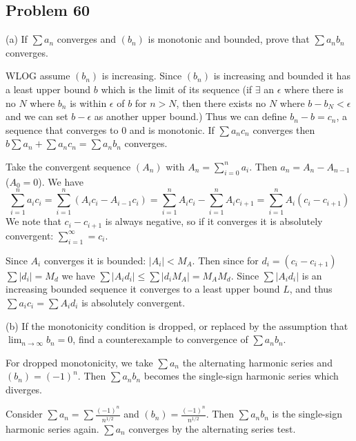 \documentclass{amsart}
\begin{document}
\newpage

\subsection*{Problem 60} 

(a) If $\sum a_n$ converges and $(b_n)$ is monotonic and bounded, prove that $\sum a_n b_n$ converges.

\medskip \noindent WLOG assume $(b_n)$ is increasing. Since $(b_n)$ is increasing and bounded it has a least upper bound $b$
which is the limit of its sequence (if $\exists$ an $\epsilon$ where there is no $N$ where
$b_n$ is within $\epsilon$ of $b$ for $n>N$, then there exists no $N$ where $b-b_N<\epsilon$ and
we can set $b-\epsilon$ as another upper bound.) Thus we can define $b_n-b=c_n$, a sequence that converges
to $0$ and is monotonic. If $\sum a_nc_n$ converges then $b\sum a_n + \sum a_nc_n=\sum a_nb_n$ converges.

\medskip \noindent Take the convergent sequence $(A_n)$ with $A_n = \sum_{i=0}^n a_i$. Then $a_n=A_n-A_{n-1}$ ($A_0=0$).
We have \[\sum_{i=1}^{n} a_ic_i = \sum_{i=1}^{n} (A_ic_i-A_{i-1}c_i)=\sum_{i=1}^{n} A_ic_i-\sum_{i=1}^{n} A_ic_{i+1}=\sum_{i=1}^{n} A_i(c_i-c_{i+1})\]
We note that $c_i-c_{i+1}$ is always negative, so if it converges it is absolutely convergent: $\sum_{i=1}^{\infty}=c_i$. 

\medskip\noindent Since $A_i$ converges it is bounded: $|A_i|<M_A$. Then since for $d_i= (c_i-c_{i+1})$
$\sum |d_i| = M_d$ we have  $\sum |A_id_i| \leq \sum |d_iM_A| = M_AM_d$. Since $\sum |A_id_i|$ is 
an increasing bounded sequence it converges to a least upper bound $L$, and thus $\sum a_ic_i = \sum A_id_i$ is absolutely convergent. 


\bigskip

(b) If the monotonicity condition is dropped, or replaced by the assumption that 
$\lim_{n\rightarrow\infty}b_n = 0$, find a counterexample to convergence of $\sum a_n b_n$.

\medskip \noindent For dropped monotonicity, we take $\sum a_n$ the alternating harmonic series and $(b_n)=(-1)^n$. Then
$\sum a_nb_n$ becomes the single-sign harmonic series which diverges.

\medskip \noindent Consider $\sum a_n=\sum\frac{(-1)^n}{n^{1/2}}$ and $(b_n) =\frac{(-1)^n}{n^{1/2}}$.
Then $\sum a_nb_n$ is the single-sign harmonic series again. $\sum a_n$ converges by the alternating
series test.

\newpage
\end{document}
